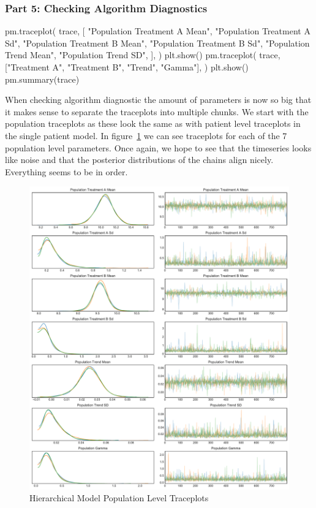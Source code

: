 \documentclass[12pt,a4paper,leqno]{report}
\theoremstyle{plain}
\theoremstyle{definition}
\theoremstyle{remark}
\begin{document}
\subsubsection*{Part 5: Checking Algorithm Diagnostics}

\bigskip
\begin{pyverbatim}[][fontsize=\footnotesize]
    pm.traceplot(
        trace,
        [
            "Population Treatment A Mean",
            "Population Treatment A Sd",
            "Population Treatment B Mean",
            "Population Treatment B Sd",
            "Population Trend Mean",
            "Population Trend SD",
        ],
    )
    plt.show()
    pm.traceplot(
        trace, ["Treatment A", "Treatment B", "Trend", "Gamma"],
    )
    plt.show()
    pm.summary(trace)
\end{pyverbatim}
\bigskip

When checking algorithm diagnostic the amount of parameters is now so big that it makes
sense to separate the traceplots into multiple chunks. We start with the population
traceplots as these look the same as with patient level traceplots in the single patient
model. In figure\ \ref{hierarchicalmodelpopulationtraceplots} we can see traceplots for each of
the 7 population level parameters. Once again, we hope to see that the timeseries looks
like noise and that the posterior distributions of the chains align nicely. Everything
seems to be in order.

\bigskip
\begin{figure}[H]
    \caption{Hierarchical Model Population Level Traceplots}\label{hierarchicalmodelpopulationtraceplots}
    \bigskip
    \includegraphics[width=\textwidth,height=\textheight,keepaspectratio]{hierarchical_model_population_level_traceplot.pdf}
\end{figure}
\bigskip
\end{document}
